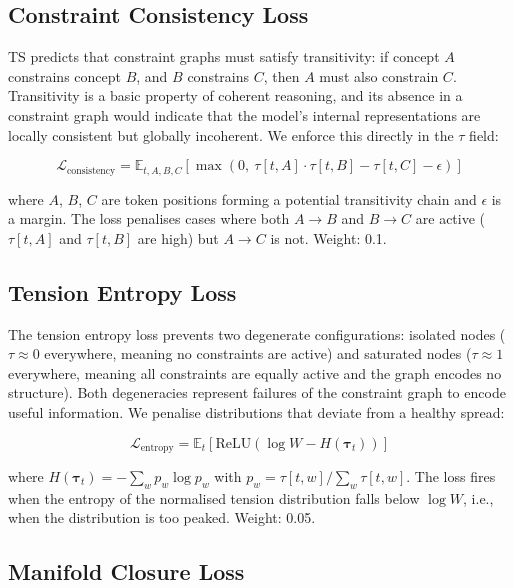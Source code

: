 \documentclass[10pt,a4paper]{article}
\begin{document}
\subsection{Constraint Consistency Loss}

TS predicts that constraint graphs must satisfy transitivity: if concept $A$ constrains concept $B$, and $B$ constrains $C$, then $A$ must also constrain $C$. Transitivity is a basic property of coherent reasoning, and its absence in a constraint graph would indicate that the model's internal representations are locally consistent but globally incoherent. We enforce this directly in the $\tau$ field:

\begin{equation}
    \mathcal{L}_{\text{consistency}} = \mathbb{E}_{t,A,B,C}\!\left[\max\!\left(0,\ \tau[t, A] \cdot \tau[t, B] - \tau[t, C] - \epsilon\right)\right]
\end{equation}

where $A$, $B$, $C$ are token positions forming a potential transitivity chain and $\epsilon$ is a margin. The loss penalises cases where both $A \rightarrow B$ and $B \rightarrow C$ are active ($\tau[t,A]$ and $\tau[t,B]$ are high) but $A \rightarrow C$ is not. Weight: 0.1.

\subsection{Tension Entropy Loss}

The tension entropy loss prevents two degenerate configurations: isolated nodes ($\tau \approx 0$ everywhere, meaning no constraints are active) and saturated nodes ($\tau \approx 1$ everywhere, meaning all constraints are equally active and the graph encodes no structure). Both degeneracies represent failures of the constraint graph to encode useful information. We penalise distributions that deviate from a healthy spread:

\begin{equation}
    \mathcal{L}_{\text{entropy}} = \mathbb{E}_{t}\!\left[\text{ReLU}\!\left(\log W - H(\boldsymbol{\tau}_t)\right)\right]
\end{equation}

where $H(\boldsymbol{\tau}_t) = -\sum_w p_w \log p_w$ with $p_w = \tau[t,w] / \sum_w \tau[t,w]$. The loss fires when the entropy of the normalised tension distribution falls below $\log W$, i.e., when the distribution is too peaked. Weight: 0.05.

\subsection{Manifold Closure Loss}
\end{document}
